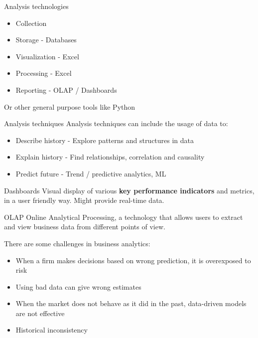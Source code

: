 \begin{theorem}
    {Analysis technologies}
    \begin{itemize}
        \item Collection
        \item Storage - Databases
        \item Visualization - Excel
        \item Processing - Excel
        \item Reporting - OLAP / Dashboards
    \end{itemize}
    Or other general purpose tools like Python
\end{theorem}
\label{analysis:technology}

\begin{theorem}
    {Analysis techniques}
    Analysis techniques can include the usage of data to:
    \begin{itemize}
        \item Describe history - Explore patterns and structures in data
        \item Explain history - Find relationships, correlation and causality
        \item Predict future - Trend / predictive analytics, ML
    \end{itemize}
\end{theorem}
\label{analysis:technique}

\begin{knBox}
    {Dashboards}
    Visual display of various \textbf{key performance indicators} and metrics, in a user friendly way. Might provide real-time data.
\end{knBox}

\begin{knBox}
    {OLAP}
    Online Analytical Processing, a technology that allows users to extract and view business data from different points of view.
\end{knBox}

There are some challenges in business analytics:

\begin{itemize}
    \item When a firm makes decisions based on wrong prediction, it is overexposed to risk
    \item Using bad data can give wrong estimates
    \item When the market does not behave as it did in the past, data-driven models are not effective
    \item Historical inconsistency
\end{itemize}
